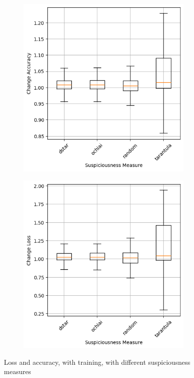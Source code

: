 \begin{figure}
    \begin{subfigure}{0.5\textwidth}
        \centering
        \includegraphics[width=0.95\textwidth]{plots/Meassure_Trained_accuracy.png}
    \end{subfigure}
    \begin{subfigure}{0.5\textwidth}
        \centering
        \includegraphics[width=0.95\textwidth]{plots/Meassure_Trained_loss.png}
    \end{subfigure}
    \caption{Loss and accuracy, with training, with different suspiciousness measures}
    \label{fig:suspiciousness-measures-training}
\end{figure}
